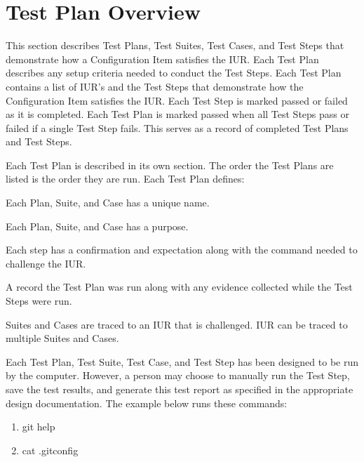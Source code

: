 \newpage
\section{Test Plan Overview}
This section describes Test Plans, Test Suites, Test Cases, and Test Steps that
demonstrate how a Configuration Item satisfies the IUR\@.  Each Test Plan
describes any setup criteria needed to conduct the Test Steps. Each Test Plan
contains a list of IUR's and the Test Steps that demonstrate how
the Configuration Item satisfies the IUR\@. Each Test Step is marked passed or
failed as it is completed.  Each Test Plan is marked passed when all Test Steps
pass or failed if a single Test Step fails.  This serves as a record of
completed Test Plans and Test Steps.

Each Test Plan is described in its own section.  The order the Test Plans
are listed is the order they are run.  Each Test Plan defines:

\begin{description}[labelindent=25pt, style=multiline, leftmargin=4.0cm]

\item[name]
  Each Plan, Suite, and Case has a unique name.

\item[purpose]
  Each Plan, Suite, and Case has a purpose.

\item[Test Steps]
  Each step has a confirmation and expectation along with the command needed to
  challenge the IUR\@.

\item[Objective Evidence]
  A record the Test Plan was run along with any evidence collected while the
  Test Steps were run.

\item[Traceability]
  Suites and Cases are traced to an IUR that is challenged. IUR can be traced to
  multiple Suites and Cases.

\end{description}

Each Test Plan, Test Suite, Test Case,  and Test Step has been designed to be
run by the computer. However, a person may choose to manually run the Test
Step, save the test results, and generate this test report as specified in the
appropriate design documentation.  The example below runs these commands:

\begin{enumerate}
  \item git help
  \item cat \@.gitconfig
\end{enumerate}

